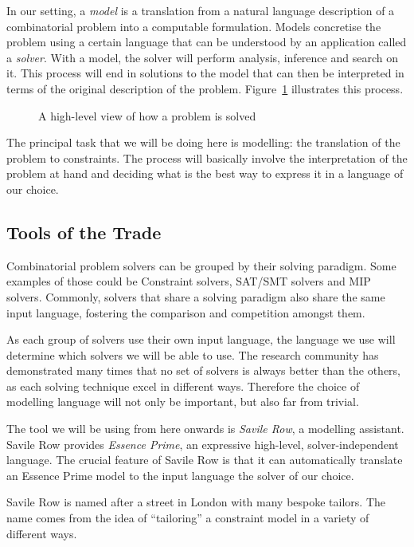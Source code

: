 In our setting, a \emph{model} is a translation from a natural language
description of a combinatorial problem into a computable formulation. Models
concretise the problem using a certain language that can be understood by an
application called a \emph{solver}. 
With a model, the solver will perform
analysis, inference and search on it. This process will end in solutions to the
model that can then be interpreted in terms of the original description of the
problem. Figure~\ref{fig-modelling} illustrates this process.

\begin{figure}
    \centering
    
    \label{fig-modelling}
    \caption{A high-level view of how a problem is solved}
\end{figure}

The principal task that we will be doing here is modelling: the translation of
the problem to constraints. The process will basically involve the
interpretation of the problem at hand and deciding what is the best way to
express it in a language of our choice.

\subsection{Tools of the Trade}

Combinatorial problem solvers can be grouped by their solving paradigm. Some
examples of those could be Constraint solvers, SAT/SMT solvers and MIP solvers.
Commonly, solvers that share a solving paradigm also share the same input
language, fostering the comparison and competition amongst them. 

As each group of solvers use their own input language, the language we use will
determine which solvers we will be able to use.
The research community has demonstrated many times that no set of solvers is
always better than the others, as each solving technique excel in different
ways. Therefore the choice of modelling language will not only be important, but
also far from trivial.

The tool we will be using from here onwards is \emph{Savile Row}, a modelling
assistant. Savile Row provides \emph{Essence Prime}, an expressive high-level,
solver-independent language. The crucial feature of Savile Row is that it can
automatically translate an Essence Prime model to the input language the solver
of our choice.

Savile Row is named after a street in London with many bespoke tailors. The
name comes from the idea of ``tailoring'' a constraint model in a variety of
different ways.

